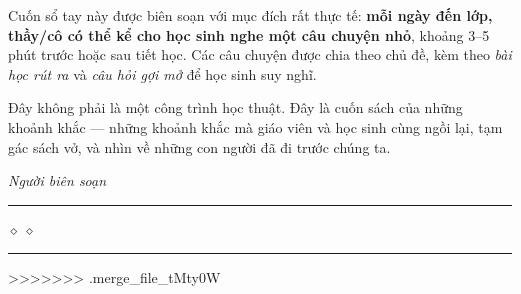 Cuốn sổ tay này được biên soạn với mục đích rất thực tế: \textbf{mỗi ngày đến
lớp, thầy/cô có thể kể cho học sinh nghe một câu chuyện nhỏ}, khoảng 3--5 phút
trước hoặc sau tiết học. Các câu chuyện được chia theo chủ đề, kèm theo
\textit{bài học rút ra} và \textit{câu hỏi gợi mở} để học sinh suy nghĩ.

Đây không phải là một công trình học thuật. Đây là cuốn sách của những khoảnh
khắc --- những khoảnh khắc mà giáo viên và học sinh cùng ngồi lại, tạm gác
sách vở, và nhìn về những con người đã đi trước chúng ta.

\vspace{0.6cm}

\begin{flushright}
  \textit{Người biên soạn}\\[0.4cm]
  {\color{truyengold}\rule{3cm}{1pt}\quad\large$\diamond\;\diamond$\quad\rule{3cm}{1pt}}
\end{flushright}
>>>>>>> .merge_file_tMty0W
